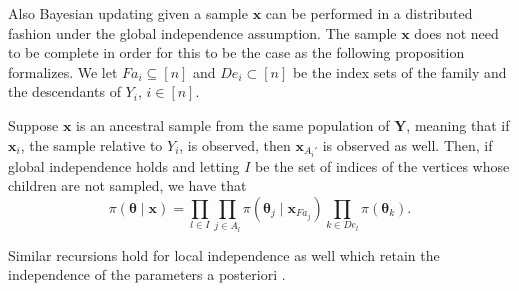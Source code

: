 Also Bayesian updating given a sample $\bm{x}$ can be performed in a distributed fashion under the global independence assumption. The sample $\bm{x}$ does not need to be complete in order for this to be the case as the following proposition formalizes. We let $Fa_i\subseteq[n]$ and $De_i\subset[n]$ be the index sets of the family and the descendants of $Y_i$, $i\in[n]$.

\begin{proposition}
\label{prop:ancupd}
Suppose $\bm{x}$ is an ancestral sample from the same population of $\bm{Y}$, meaning that if $\bm{x}_i$, the sample relative to $Y_i$, is observed, then $\bm{x}_{A_i'}$ is observed as well. Then, if global independence holds and letting $I$ be the set of indices of the vertices whose children are not sampled, we have that
\begin{equation*}
\pi(\bm{\theta}\;|\;\bm{x})=\prod_{l\in I}\prod_{j\in A_l}\pi(\bm{\theta}_j\;|\;\bm{x}_{Fa_j})\prod_{k\in De_l}\pi(\bm{\theta}_k).
\end{equation*}
\end{proposition}
Similar recursions hold for local independence as well which retain the independence of the parameters a posteriori \citep[see][]{Spiegelhalter1990}.

